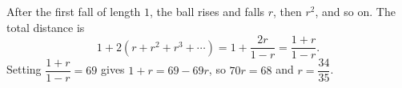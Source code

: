 After the first fall of length $1$, the ball rises and falls $r$, then $r^2$, and so on. The total distance is
\[1+2\left(r+r^2+r^3+\cdots\right)=1+\dfrac{2r}{1-r}=\dfrac{1+r}{1-r}.\]
Setting $\dfrac{1+r}{1-r}=69$ gives $1+r=69-69r$, so $70r=68$ and $r=\boxed{\dfrac{34}{35}}$.
